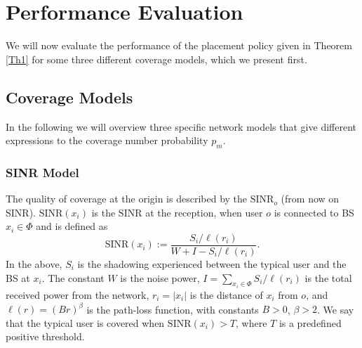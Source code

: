 \documentclass[conference,twocolum,final]{IEEEtran}
\begin{document}
\section{Performance Evaluation}
\label{secV}


We will now evaluate the performance of the placement policy given in Theorem \ref{Th1} for some  three different coverage models, which we present first.

\subsection{Coverage Models}
\label{ss.CoverageModels}
In the following we will overview three specific network models that give different expressions to the coverage number probability $p_m$.

\subsubsection{SINR Model} The quality of coverage at the origin is described by the $\mathrm{SINR}_o$ (from now on $\mathrm{SINR}$). $\mathrm{SINR}(x_i)$ is the $\mathrm{SINR}$ at the reception, when user $o$ is connected to BS $x_i\in\Phi$ and is defined as
\begin{equation}
\label{SINRdef}
\mathrm{SINR}(x_i):=\frac{S_{i}/\ell(r_i)}{W+I-S_i/\ell(r_i)}.
\end{equation}
In the above, $S_i$ is the shadowing experienced between the typical user and the BS at $x_i$. The constant $W$ is the noise power, $I=\sum_{x_i\in\Phi}S_i/\ell(r_i)$ is the total received power from the network, $r_i=\left| x_i\right|$ is the distance of $x_i$ from $o$, and $\ell(r)=\left(Br\right)^{\beta}$ is the path-loss function, with constants $B>0$, $\beta>2$. We say that the typical user is covered when $\mathrm{SINR}(x_i)>T$, where $T$ is a predefined positive threshold.
\end{document}

